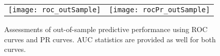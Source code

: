 \begin{figure}[ht]
	\centering
	\begin{tabular}{cc}
	\texttt{[image: roc\_outSample]} & 
	\texttt{[image: rocPr\_outSample]}	
	\end{tabular}
	\caption{Assessments of out-of-sample predictive performance using ROC curves and PR curves. AUC statistics are provided as well for both curves.}
	\label{fig:roc}
\end{figure}
\FloatBarrier
